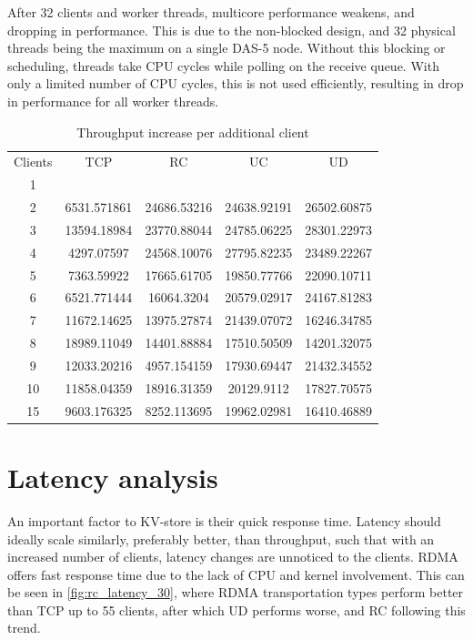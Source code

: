 After 32 clients and worker threads, multicore performance weakens, and dropping in performance.
This is due to the non-blocked design, and 32 physical threads being the maximum on a single DAS-5 node.
Without this blocking or scheduling, threads take CPU cycles while polling on the receive queue.
With only a limited number of CPU cycles, this is not used efficiently, resulting in drop in performance for all worker threads.


\begin{table}
    \begin{tabular}{ccccc}
        Clients & TCP & RC & UC & UD \\
        1 & & & & \\
        2 & 6531.571861 & 24686.53216 & 24638.92191 & 26502.60875 \\
        3 & 13594.18984 & 23770.88044 & 24785.06225 & 28301.22973 \\
        4 & 4297.07597 & 24568.10076 & 27795.82235 & 23489.22267 \\
        5 & 7363.59922 & 17665.61705 & 19850.77766 & 22090.10711 \\
        6 & 6521.771444 & 16064.3204 & 20579.02917 & 24167.81283 \\
        7 & 11672.14625 & 13975.27874 & 21439.07072 & 16246.34785 \\
        8 & 18989.11049 & 14401.88884 & 17510.50509 & 14201.32075 \\
        9 & 12033.20216 & 4957.154159 & 17930.69447 & 21432.34552 \\
        10 & 11858.04359 & 18916.31359 & 20129.9112 & 17827.70575 \\
        15 & 9603.176325 & 8252.113695 & 19962.02981 & 16410.46889 \\
    \end{tabular}
    \caption{Throughput increase per additional client}
    \label{tab:throughput_add_client}
\end{table}


\section{Latency analysis}\label{sec:latency:analysis}
An important factor to KV-store is their quick response time.
Latency should ideally scale similarly, preferably better, than throughput, such that with an increased number of clients, latency changes are unnoticed to the clients.
RDMA offers fast response time due to the lack of CPU and kernel involvement.
This can be seen in \ref{fig:rc_latency_30}, where RDMA transportation types perform better than TCP up to 55 clients, after which UD performs worse, and RC following this trend.

